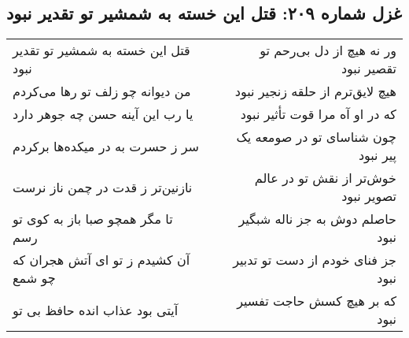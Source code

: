 \begin{center}
\section*{غزل شماره ۲۰۹: قتل این خسته به شمشیر تو تقدیر نبود}
\label{sec:sh209}
\begin{longtable}{l p{0.5cm} r}
قتل این خسته به شمشیر تو تقدیر نبود
&&
ور نه هیچ از دل بی‌رحم تو تقصیر نبود
\\
من دیوانه چو زلف تو رها می‌کردم
&&
هیچ لایق‌ترم از حلقه زنجیر نبود
\\
یا رب این آینه حسن چه جوهر دارد
&&
که در او آه مرا قوت تأثیر نبود
\\
سر ز حسرت به در میکده‌ها برکردم
&&
چون شناسای تو در صومعه یک پیر نبود
\\
نازنین‌تر ز قدت در چمن ناز نرست
&&
خوش‌تر از نقش تو در عالم تصویر نبود
\\
تا مگر همچو صبا باز به کوی تو رسم
&&
حاصلم دوش به جز ناله شبگیر نبود
\\
آن کشیدم ز تو ای آتش هجران که چو شمع
&&
جز فنای خودم از دست تو تدبیر نبود
\\
آیتی بود عذاب انده حافظ بی تو
&&
که بر هیچ کسش حاجت تفسیر نبود
\\
\end{longtable}
\end{center}
